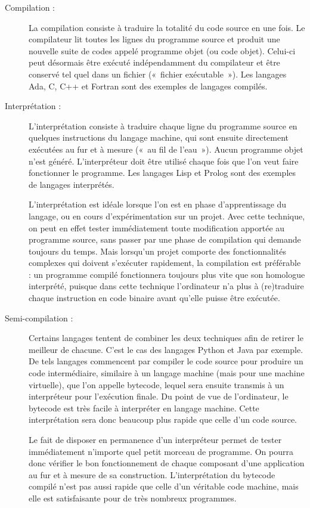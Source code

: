 \begin{description}
\item[Compilation :]  La compilation consiste à traduire la totalité du code source en une fois. 
Le compilateur lit toutes les lignes du programme source et produit une nouvelle 
suite de codes appelé programme objet (ou code objet). 
Celui-ci peut désormais être exécuté indépendamment du
compilateur et être conservé tel quel dans un fichier («~fichier exécu\-table~»).
Les langages {\sc Ada}, {\sc C}, {\sc C++} et {\sc Fortran} sont des exemples de langages 
compilés.

\item[Interprétation :]  L'interprétation consiste à traduire chaque ligne du programme source en quelques instructions
du langage machine, qui sont ensuite directement exécutées au fur et à mesure
(«~au fil de l'eau~»). Aucun programme objet n'est généré.
L'interpréteur doit être utilisé chaque fois que l'on veut faire fonctionner le programme. 
Les langages {\sc Lisp} et {\sc Prolog} sont des exemples de langages interprétés.

L'interprétation est idéale lorsque l'on est en phase d'apprentissage du langage, ou en cours
d'expérimentation sur un projet. Avec cette technique, on peut en effet tester immédiatement toute
modification apportée au programme source, sans passer par une phase de compilation qui demande
toujours du temps.
Mais lorsqu'un projet comporte des fonctionnalités complexes qui doivent s'exécuter
rapidement, la compilation est préférable : un programme compilé fonctionnera
toujours plus vite que son homologue interprété, puisque dans cette technique l'ordinateur
n'a plus à (re)traduire chaque instruction en code binaire avant qu'elle puisse être exécutée.

\item[Semi-compilation :]  Certains langages tentent de combiner les deux techniques afin de retirer le meilleur de
chacune. C'est le cas des langages {\sc Python} et {\sc Java} par exemple. 
De tels langages
commencent par compiler le code source pour produire un code intermédiaire, similaire à un langage
machine (mais pour une machine virtuelle), que l'on appelle bytecode, lequel sera ensuite transmis 
à un interpréteur pour l'exécution
finale. Du point de vue de l'ordinateur, le bytecode est très facile à interpréter en langage machine.
Cette interprétation sera donc beaucoup plus rapide que celle d'un code source.

Le fait de disposer en permanence d'un interpréteur permet de tester immédiatement n'importe
quel petit morceau de programme. On pourra donc vérifier le bon fonctionnement de chaque
composant d'une application au fur et à mesure de sa construction.
L'interprétation du bytecode compilé n'est pas aussi rapide que celle d'un véritable code machine,
mais elle est satisfaisante pour de très nombreux programmes.
\end{description}

